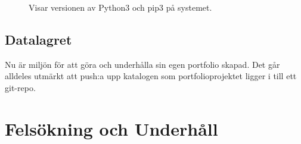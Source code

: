 \documentclass{TDP003mall}
\begin{document}
\begin{figure}[h]
  \centerline{}
  \caption{Visar versionen av Python3 och pip3 på systemet.}
  \label{fig}
\end{figure}

\subsection{Datalagret}

Nu är miljön för att göra och underhålla sin egen portfolio skapad. Det går alldeles utmärkt att push:a upp katalogen som portfolioprojektet ligger i till ett git-repo.



\section{Felsökning och Underhåll}
\end{document}
